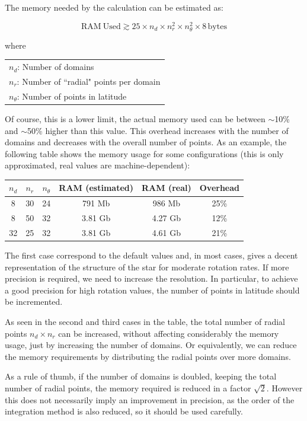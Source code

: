 The memory needed by the calculation can be estimated as:

$$\mathrm{RAM\ Used}\gtrsim25\times n_d\times n_r^2 \times n_\theta^2 \times 8\, \mathrm{bytes}$$

where

\medskip

\begin{tabular}{l}
$n_d$: Number of domains \\
$n_r$: Number of ``radial" points per domain \\
$n_\theta$: Number of points in latitude \\
\end{tabular}

\medskip

Of course, this is a lower limit, the actual memory used can be between
$\sim$10\% and $\sim$50\% higher than this value.  This overhead
increases with the number of domains and decreases with the overall
number of points. As an example, the following table shows the memory
usage for some configurations (this is only approximated, real values
are machine-dependent):

\begin{center}
\begin{tabular}{c|c|c|c|c|c}
$n_d$&$n_r$&$n_\theta$&RAM (estimated)&RAM (real)&Overhead\\
\hline
8&30&24& 791 Mb & 986 Mb & 25\% \\
8&50&32& 3.81 Gb & 4.27 Gb & 12\% \\
32&25&32& 3.81 Gb & 4.61 Gb & 21\% \\
\end{tabular}
\end{center}

The first case correspond to the default values and, in most cases,
gives a decent representation of the structure of the star for moderate
rotation rates.  If more precision is required, we need to increase the
resolution. In particular, to achieve a good precision for high rotation
values, the number of points in latitude should be incremented.

As seen in the second and third cases in the table, the total number
of radial points $n_d\times n_r$ can be increased, without affecting
considerably the memory usage, just by increasing the number of domains.
Or equivalently, we can reduce the memory requirements by distributing
the radial points over more domains.

As a rule of thumb, if the number of domains is doubled, keeping the
total number of radial points, the memory required is reduced in a factor
$\sqrt{2}$. However this does not necessarily imply an improvement
in precision, as the order of the integration method is also reduced,
so it should be used carefully.

